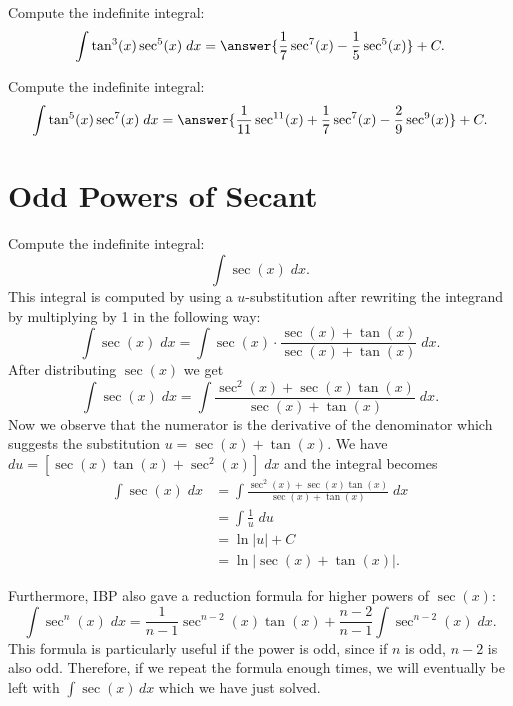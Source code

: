 \documentclass{ximera}
\begin{document}
\begin{problem}
Compute the indefinite integral:
\[
\int \tan^3(x) \sec^5(x)\;dx = \answer{\frac17 \sec^7(x) - \frac15 \sec^5(x)} + C.
\]
\end{problem}

\begin{problem}
Compute the indefinite integral:
\[
\int \tan^5(x) \sec^7(x)\;dx = \answer{\frac{1}{11} \sec^{11}(x) + \frac17 \sec^7(x) -\frac29 \sec^9(x)} + C.
\]
\end{problem}





\section{Odd Powers of Secant}
\begin{example}
Compute the indefinite integral:
\[
\int \sec(x) \; dx.
\]
This integral is computed by using a $u$-substitution after rewriting the integrand
by multiplying by 1 in the following way:
\[
\int \sec(x) \; dx = \int \sec(x) \cdot \frac{\sec(x) + \tan(x)}{\sec(x) + \tan(x)} \; dx.
\]
After distributing $\sec(x)$ we get
\[
\int \sec(x) \; dx = \int \frac{\sec^2(x) + \sec(x)\tan(x)}{\sec(x) + \tan(x)} \; dx.
\]
Now we observe that the numerator is the derivative of the denominator which suggests the substitution
$u = \sec(x) + \tan(x)$. We have $du = [ \sec(x)\tan(x) + \sec^2(x)] \; dx$ and the integral becomes
\begin{align*}
\int \sec(x) \; dx &= \int \frac{\sec^2(x) + \sec(x)\tan(x)}{\sec(x) + \tan(x)} \; dx\\
&= \int \frac{1}{u} \; du\\
&= \ln|u| + C\\
&= \ln|\sec(x) + \tan(x)|.
\end{align*}

\end{example}

Furthermore, IBP also gave a reduction formula for higher powers of $\sec(x)$:
\[
\int \sec^n(x) \; dx =  \frac{1}{n-1}\sec^{n-2}(x)\tan(x) + \frac{n-2}{n-1}\int \sec^{n-2}(x) \; dx. 
\]
This formula is particularly useful if
the power is odd, since if $n$ is odd, $n-2$ is also odd.  Therefore, if we repeat the formula enough times, 
we will eventually be left with $\int \sec(x) \, dx$
which we have just solved.
\end{document}

